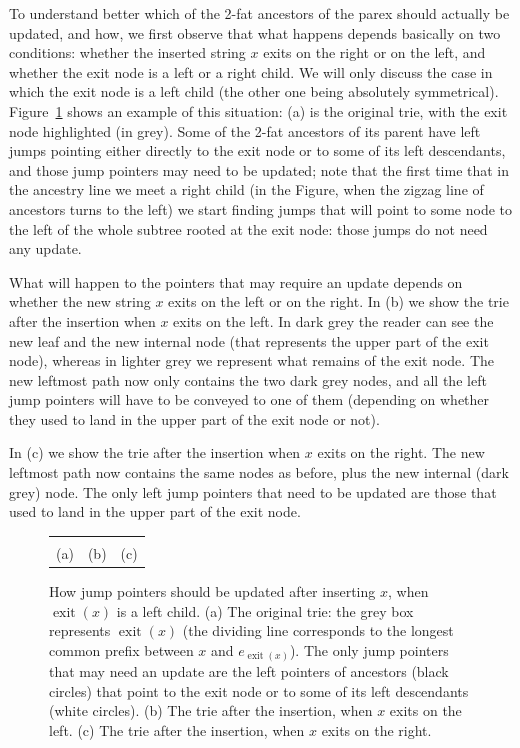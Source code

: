 \documentclass[a4paper]{article}
\newcommand{\exit}[1]{\operatorname{exit}(#1)}
\newcommand{\?}{\mskip1.5mu}
\begin{document}
 
To understand better which of the 2-fat ancestors of the parex should actually be updated, and how, we 
first observe that what happens depends basically on two conditions: whether the inserted string $x$ exits on
the right or on the left, and whether the exit node is a left or a right child.
We will only discuss the case in which the exit node is a left child (the other one being absolutely symmetrical).
Figure~\ref{fig:jumpadjustment} shows an example of this situation: (a) is the original trie, with the
exit node highlighted (in grey). Some of the 2-fat ancestors of its parent have left jumps pointing either directly
to the exit node or to some of its left descendants, and those jump pointers may need to be updated; note that the first time that in the ancestry line 
we meet a right child (in the Figure, when the zigzag line of ancestors turns to the left) we start finding jumps that
will point to some node to the left of the whole subtree rooted at the exit node: those jumps do not
need any update. 

What will happen to the pointers that may require an update depends on whether the new string $x$ exits on the left or on the right. 
In (b) we show the trie after the insertion when $x$ exits on the left. In dark grey the reader 
can see the new leaf
and the new internal node (that represents the upper part of the exit node), whereas in lighter grey 
we represent what remains of the exit node.
The new leftmost path now only contains the two dark grey nodes, and all the left jump pointers will have to
be conveyed to one of them (depending on whether they used to land in the upper part of the exit node or not).

In (c) we show the trie after the insertion when $x$ exits on the right. 
The new leftmost path now contains the same nodes as before, plus the new internal (dark grey) node.
The only left jump pointers that need to be updated are those that used to land in the upper part of the exit node.
    
  
\begin{figure}[htbp]
 \centering
 \begin{tabular}{ccc}
  &
  &
 \\
 (a) & (b) & (c) 
 \end{tabular}
 \caption{\label{fig:jumpadjustment}How jump pointers should be updated after inserting $x$, when  $\exit x$ is a left child. 
 (a) The original trie: the grey box represents $\exit x$ (the dividing line corresponds 
 to the longest common prefix between $x$ and $e_{\exit x}$).
 The only jump pointers that may need an update are the left pointers of ancestors (black circles) that point to the
 exit node or to some of its left descendants (white circles). 
 (b) The trie after the insertion, when $x$ exits on the left. 
 (c) The trie after the insertion, when $x$ exits on the right. }
\end{figure}
\end{document}
